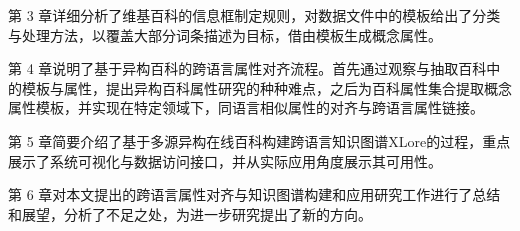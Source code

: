 第 3 章详细分析了维基百科的信息框制定规则，对数据文件中的模板给出了分类与处理方法，以覆盖大部分词条描述为目标，借由模板生成概念属性。

第 4 章说明了基于异构百科的跨语言属性对齐流程。首先通过观察与抽取百科中的模板与属性，提出异构百科属性研究的种种难点，之后为百科属性集合提取概念属性模板，并实现在特定领域下，同语言相似属性的对齐与跨语言属性链接。

第 5 章简要介绍了基于多源异构在线百科构建跨语言知识图谱XLore的过程，重点展示了系统可视化与数据访问接口，并从实际应用角度展示其可用性。

第 6 章对本文提出的跨语言属性对齐与知识图谱构建和应用研究工作进行了总结和展望，分析了不足之处，为进一步研究提出了新的方向。


